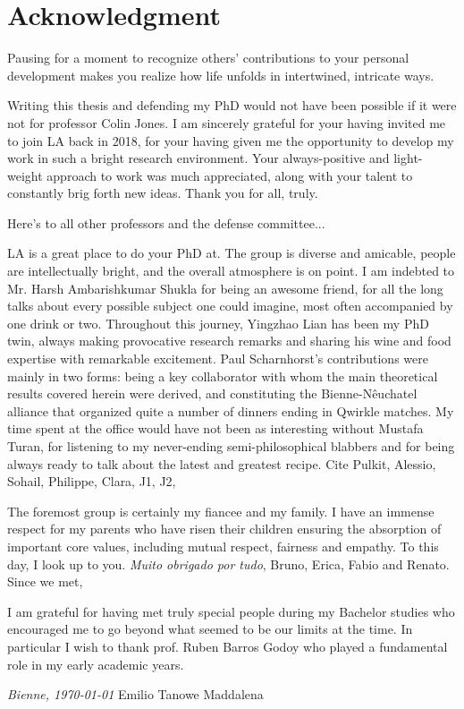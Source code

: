 \chapter*{Acknowledgment}

Pausing for a moment to recognize others' contributions to your personal development makes you realize how life unfolds in intertwined, intricate ways.

Writing this thesis and defending my PhD would not have been possible if it were not for professor Colin Jones. I am sincerely grateful for your having invited me to join LA back in 2018, for your having given me the opportunity to develop my work in such a bright research environment. Your always-positive and light-weight approach to work was much appreciated, along with your talent to constantly brig forth new ideas. Thank you for all, truly.

Here's to all other professors and the defense committee...

LA is a great place to do your PhD at. The group is diverse and amicable, people are intellectually bright, and the overall atmosphere is on point. I am indebted to Mr. Harsh Ambarishkumar Shukla for being an awesome friend, for all the long talks about every possible subject one could imagine, most often accompanied by one drink or two. Throughout this journey, Yingzhao Lian has been my PhD twin, always making provocative research remarks and sharing his wine and food expertise with remarkable excitement. Paul Scharnhorst's contributions were mainly in two forms: being a key collaborator with whom the main theoretical results covered herein were derived, and constituting the Bienne-Nêuchatel alliance that organized quite a number of dinners ending in Qwirkle matches. My time spent at the office would have not been as interesting without Mustafa Turan, for listening to my never-ending semi-philosophical blabbers and for being always ready to talk about the latest and greatest recipe. Cite Pulkit, Alessio, Sohail, Philippe, Clara, J1, J2, 

The foremost group is certainly my fiancee and my family. I have an immense respect for my parents who have risen their children ensuring the absorption of important core values, including mutual respect, fairness and empathy.  To this day, I look up to you. \textit{Muito obrigado por tudo}, Bruno, Erica, Fabio and Renato. Since we met, 

I am grateful for having met truly special people during my Bachelor studies who encouraged me to go beyond what seemed to be our limits at the time. In particular I wish to thank prof. Ruben Barros Godoy who played a fundamental role in my early academic years. 


\bigskip
 
\noindent\textit{Bienne, \today}
\hfill Emilio Tanowe Maddalena
